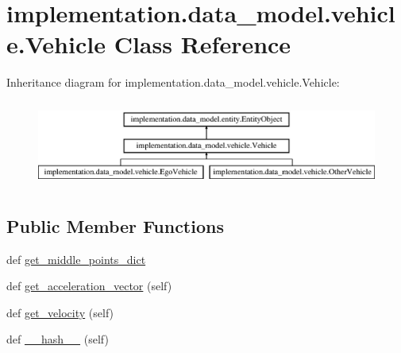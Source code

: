 \hypertarget{classimplementation_1_1data__model_1_1vehicle_1_1_vehicle}{}\section{implementation.\+data\+\_\+model.\+vehicle.\+Vehicle Class Reference}
\label{classimplementation_1_1data__model_1_1vehicle_1_1_vehicle}
Inheritance diagram for implementation.\+data\+\_\+model.\+vehicle.\+Vehicle\+:\begin{figure}[H]
\begin{center}
\leavevmode
\includegraphics[height=2.857143cm]{classimplementation_1_1data__model_1_1vehicle_1_1_vehicle}
\end{center}
\end{figure}
\subsection*{Public Member Functions}
\begin{DoxyCompactItemize}
\item 
def \hyperlink{classimplementation_1_1data__model_1_1vehicle_1_1_vehicle_a2155a545440eae609b8e4900d5cbd2f8}{get\+\_\+middle\+\_\+points\+\_\+dict}
\item 
def \hyperlink{classimplementation_1_1data__model_1_1vehicle_1_1_vehicle_ab2e31dc51c68d50d066364def03ef99c}{get\+\_\+acceleration\+\_\+vector} (self)
\item 
def \hyperlink{classimplementation_1_1data__model_1_1vehicle_1_1_vehicle_aa96b1b4dfa57da623a79a711011a6113}{get\+\_\+velocity} (self)
\item 
def \hyperlink{classimplementation_1_1data__model_1_1vehicle_1_1_vehicle_a9252c162137f564dfcec306c08f22eba}{\+\_\+\+\_\+hash\+\_\+\+\_\+} (self)
\end{DoxyCompactItemize}

